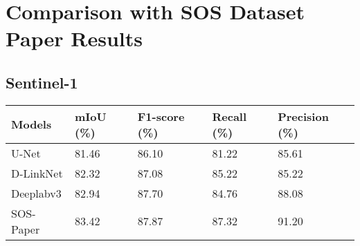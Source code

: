 \documentclass{article}
\begin{document}
\section{Comparison with SOS Dataset Paper Results}

\subsection{Sentinel-1}
\begin{tabular}{lllll}
\toprule
  Models & mIoU (\%) & F1-score (\%) & Recall (\%) & Precision (\%) \\
\midrule
  U-Net     & 81.46 & 86.10 & 81.22 & 85.61 \\
  D-LinkNet & 82.32 & 87.08 & 85.22 & 85.22 \\
  Deeplabv3 & 82.94 & 87.70 & 84.76 & 88.08 \\
  SOS-Paper & 83.42 & 87.87 & 87.32 & 91.20 \\
\midrule 
\bottomrule
\end{tabular}
\end{document}
